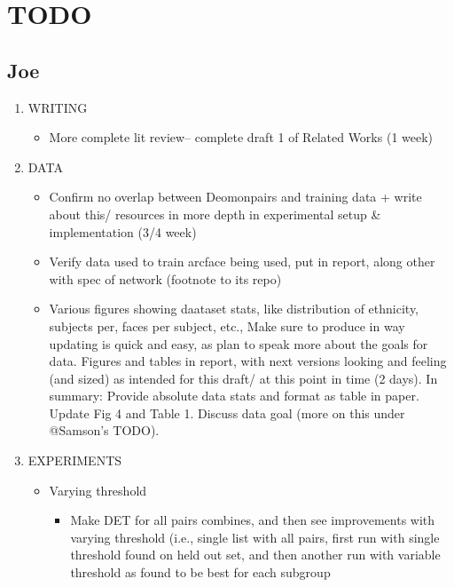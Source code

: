 \begingroup
\let\clearpage\relax 
\onecolumn 
\newpage




\section*{TODO}
\subsection{Joe}
\begin{enumerate}
    \item  WRITING
    \begin{itemize}
        \item More complete lit review-- complete draft 1 of Related Works (1 week)
    \end{itemize} 
    \item DATA
    \begin{itemize}
        \item Confirm no overlap between Deomonpairs and training data + write about this/ resources in more depth in experimental setup & implementation (3/4 week)
        \item Verify data used to train arcface being used, put in report, along other with spec of network (footnote to its repo)
        \item Various figures showing daataset stats, like distribution of ethnicity, subjects per, faces per subject, etc., Make sure to produce in way updating is quick and easy, as plan to speak more about the goals for data. Figures and tables in report, with next versions looking and feeling (and sized) as intended for this draft/ at this point in time (2 days). In summary: Provide absolute data stats and format as table in paper. Update Fig 4 and Table 1. Discuss data goal (more on this under @Samson's TODO).
    \end{itemize}
    \item EXPERIMENTS
    \begin{itemize}
        \item Varying threshold
        \begin{itemize}
            \item Make DET for all pairs combines, and then see improvements with varying threshold (i.e., single list with all pairs, first run with single threshold found on held out set, and then another run with variable threshold as found to be best for each subgroup
        \end{itemize}
        \begin{itemize}

\end{itemize}
\end{itemize}
\end{enumerate}
